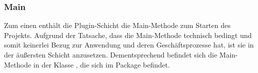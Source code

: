 \subsubsection*{Main}
Zum einen enthält die Plugin-Schicht die Main-Methode zum Starten des Projekts.
Aufgrund der Tatsache, dass die Main-Methode technisch bedingt und somit keinerlei Bezug zur Anwendung und deren Geschäftsprozesse hat, ist sie in der äußersten Schicht anzusetzen.
Dementsprechend befindet sich die Main-Methode in der Klasse \href{https://github.com/lucasmerkel/dhbw-advancedswe-programmentwurf/blob/d5c89113d12c3b877ddc4d6a99225b277ddd468f/swe_programmentwurf/consumergoods-inventory-planner/0-cip-plugins/src/main/java/de/dhbw/cip/ConsumerInventoryPlannerApplication.java}{}, die sich im Package \href{https://github.com/lucasmerkel/dhbw-advancedswe-programmentwurf/tree/main/swe_programmentwurf/consumergoods-inventory-planner/0-cip-plugins/src/main/java/de/dhbw/cip}{} befindet.

